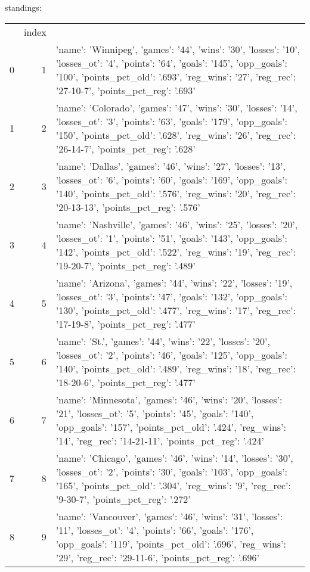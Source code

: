 {} standings:
\begin{tabular}{lrl}
 & index &  \\
0 & 1 & {'name': 'Winnipeg', 'games': '44', 'wins': '30', 'losses': '10', 'losses_ot': '4', 'points': '64', 'goals': '145', 'opp_goals': '100', 'points_pct_old': '.693', 'reg_wins': '27', 'reg_rec': '27-10-7', 'points_pct_reg': '.693'} \\
1 & 2 & {'name': 'Colorado', 'games': '47', 'wins': '30', 'losses': '14', 'losses_ot': '3', 'points': '63', 'goals': '179', 'opp_goals': '150', 'points_pct_old': '.628', 'reg_wins': '26', 'reg_rec': '26-14-7', 'points_pct_reg': '.628'} \\
2 & 3 & {'name': 'Dallas', 'games': '46', 'wins': '27', 'losses': '13', 'losses_ot': '6', 'points': '60', 'goals': '169', 'opp_goals': '140', 'points_pct_old': '.576', 'reg_wins': '20', 'reg_rec': '20-13-13', 'points_pct_reg': '.576'} \\
3 & 4 & {'name': 'Nashville', 'games': '46', 'wins': '25', 'losses': '20', 'losses_ot': '1', 'points': '51', 'goals': '143', 'opp_goals': '142', 'points_pct_old': '.522', 'reg_wins': '19', 'reg_rec': '19-20-7', 'points_pct_reg': '.489'} \\
4 & 5 & {'name': 'Arizona', 'games': '44', 'wins': '22', 'losses': '19', 'losses_ot': '3', 'points': '47', 'goals': '132', 'opp_goals': '130', 'points_pct_old': '.477', 'reg_wins': '17', 'reg_rec': '17-19-8', 'points_pct_reg': '.477'} \\
5 & 6 & {'name': 'St.', 'games': '44', 'wins': '22', 'losses': '20', 'losses_ot': '2', 'points': '46', 'goals': '125', 'opp_goals': '140', 'points_pct_old': '.489', 'reg_wins': '18', 'reg_rec': '18-20-6', 'points_pct_reg': '.477'} \\
6 & 7 & {'name': 'Minnesota', 'games': '46', 'wins': '20', 'losses': '21', 'losses_ot': '5', 'points': '45', 'goals': '140', 'opp_goals': '157', 'points_pct_old': '.424', 'reg_wins': '14', 'reg_rec': '14-21-11', 'points_pct_reg': '.424'} \\
7 & 8 & {'name': 'Chicago', 'games': '46', 'wins': '14', 'losses': '30', 'losses_ot': '2', 'points': '30', 'goals': '103', 'opp_goals': '165', 'points_pct_old': '.304', 'reg_wins': '9', 'reg_rec': '9-30-7', 'points_pct_reg': '.272'} \\
8 & 9 & {'name': 'Vancouver', 'games': '46', 'wins': '31', 'losses': '11', 'losses_ot': '4', 'points': '66', 'goals': '176', 'opp_goals': '119', 'points_pct_old': '.696', 'reg_wins': '29', 'reg_rec': '29-11-6', 'points_pct_reg': '.696'} \\

\end{tabular}
